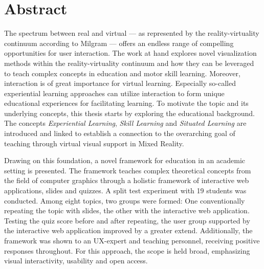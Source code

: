 %





\chapter*{Abstract}
\label{sec:abstract}
\vspace*{-10mm}

The spectrum between real and virtual --- as represented by the reality-virtuality continuum according to Milgram --- offers an endless range of compelling opportunities for user interaction.
The work at hand explores novel visualization methods within the reality-virtuality continuum and how they can be leveraged to teach complex concepts in education and motor skill learning.
Moreover, interaction is of great importance for virtual learning.
Especially so-called experiential learning approaches can utilize interaction to form unique educational experiences for facilitating learning.
To motivate the topic and its underlying concepts, this thesis starts by exploring the educational background.
The concepts \emph{Experiential Learning}, \emph{Skill Learning} and \emph{Situated Learning} are introduced and linked to establish a connection to the overarching goal of teaching through virtual visual support in Mixed Reality.

Drawing on this foundation, a novel framework for education in an academic setting is presented.
The framework teaches complex theoretical concepts from the field of computer graphics through a holistic framework of interactive web applications, slides and quizzes.
A split test experiment with 19 students was conducted.
Among eight topics, two groups were formed: One conventionally repeating the topic with slides, the other with the interactive web application.
Testing the quiz score before and after repeating, the user group supported by the interactive web application improved by a greater extend.
Additionally, the framework was shown to an UX-expert and teaching personnel, receiving positive responses throughout.
For this approach, the scope is held broad, emphasizing visual interactivity, usability and open access.

